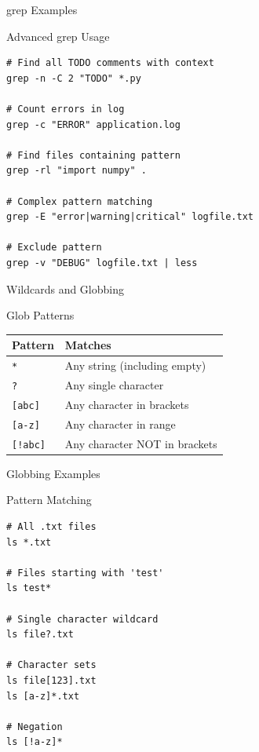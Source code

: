 \documentclass[presentation,aspectratio=1610]{beamer}
\begin{document}
\begin{frame}[label={sec:org695b0e5},fragile]{grep Examples}
 \begin{block}{Advanced grep Usage}
\begin{verbatim}
# Find all TODO comments with context
grep -n -C 2 "TODO" *.py

# Count errors in log
grep -c "ERROR" application.log

# Find files containing pattern
grep -rl "import numpy" .

# Complex pattern matching
grep -E "error|warning|critical" logfile.txt

# Exclude pattern
grep -v "DEBUG" logfile.txt | less
\end{verbatim}
\end{block}
\end{frame}
\begin{frame}[label={sec:org9d1c15a},fragile]{Wildcards and Globbing}
 \begin{block}{Glob Patterns}
\begin{center}
\begin{tabular}{ll}
Pattern & Matches\\
\hline
\texttt{*} & Any string (including empty)\\
\texttt{?} & Any single character\\
\texttt{[abc]} & Any character in brackets\\
\texttt{[a-z]} & Any character in range\\
\texttt{[!abc]} & Any character NOT in brackets\\
\end{tabular}
\end{center}
\end{block}
\end{frame}
\begin{frame}[label={sec:org7b39188},fragile]{Globbing Examples}
 \begin{block}{Pattern Matching}
\begin{verbatim}
# All .txt files
ls *.txt

# Files starting with 'test'
ls test*

# Single character wildcard
ls file?.txt

# Character sets
ls file[123].txt
ls [a-z]*.txt

# Negation
ls [!a-z]*
\end{verbatim}
\end{block}
\end{frame}
\end{document}
